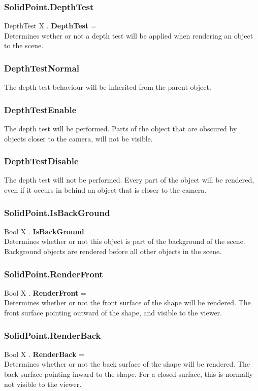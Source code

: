 \documentclass[10pt]{book}
\begin{document}
\subsubsection{SolidPoint.DepthTest \label{F:SolidPoint:DepthTest}}
DepthTest X . \textbf{DepthTest} = \\
Determines wether or not a depth test will be applied when rendering an object to the scene.

\subsubsection{DepthTestNormal \label{T:DepthTest|DepthTestNormal}}
The depth test behaviour will be inherited from the parent object.

\subsubsection{DepthTestEnable \label{T:DepthTest|DepthTestEnable}}
The depth test will be performed. Parts of the object that are obscured by objects closer to the camera, will not be visible.

\subsubsection{DepthTestDisable \label{T:DepthTest|DepthTestDisable}}
The depth test will not be performed. Every part of the object will be rendered, even if it occurs in behind an object that is closer to the camera.

\subsubsection{SolidPoint.IsBackGround \label{F:SolidPoint:IsBackGround}}
Bool X . \textbf{IsBackGround} = \\
Determines whether or not this object is part of the background of the scene. Background objects are rendered before all other objects in the scene.

\subsubsection{SolidPoint.RenderFront \label{F:SolidPoint:RenderFront}}
Bool X . \textbf{RenderFront} = \\
Determines whether or not the front surface of the shape will be rendered. The front surface pointing outward of the shape, and visible to the viewer.

\subsubsection{SolidPoint.RenderBack \label{F:SolidPoint:RenderBack}}
Bool X . \textbf{RenderBack} = \\
Determines whether or not the back surface of the shape will be rendered. The back surface pointing inward to the shape. For a closed surface, this is normally not visible to the viewer.
\end{document}
